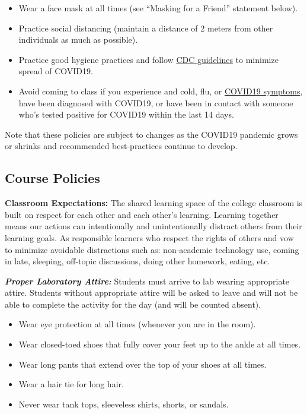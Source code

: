 \documentclass[]{tufte-book}
\providecommand{\tightlist}{%
  \setlength{\itemsep}{0pt}\setlength{\parskip}{0pt}}
\begin{document}
\begin{itemize}
\tightlist
\item
  Wear a face mask at all times (see ``Masking for a Friend'' statement below).
\item
  Practice social distancing (maintain a distance of 2 meters from other individuals as much as possible).
\item
  Practice good hygiene practices and follow \href{https://www.cdc.gov/coronavirus/2019-ncov/prevent-getting-sick/prevention.html}{CDC guidelines} to minimize spread of COVID19.
\item
  Avoid coming to class if you experience and cold, flu, or \href{https://www.cdc.gov/coronavirus/2019-ncov/symptoms-testing/symptoms.html}{COVID19 symptoms}, have been diagnosed with COVID19, or have been in contact with someone who's tested positive for COVID19 within the last 14 days.
\end{itemize}

Note that these policies are subject to changes as the COVID19 pandemic grows or shrinks and recommended best-practices continue to develop.

\hypertarget{course-policies}{%
\subsection*{Course Policies}\label{course-policies}}

\textbf{Classroom Expectations:} The shared learning space of the college classroom is built on respect for each other and each other's learning. Learning together means our actions can intentionally and unintentionally distract others from their learning goals. As responsible learners who respect the rights of others and vow to minimize avoidable distractions such as: non-academic technology use, coming in late, sleeping, off-topic discussions, doing other homework, eating, etc.

\textbf{\emph{Proper Laboratory Attire:}} Students must arrive to lab wearing appropriate attire. Students without appropriate attire will be asked to leave and will not be able to complete the activity for the day (and will be counted absent).

\begin{itemize}
\tightlist
\item
  Wear eye protection at all times (whenever you are in the room).\\
\item
  Wear closed-toed shoes that fully cover your feet up to the ankle at all times.\\
\item
  Wear long pants that extend over the top of your shoes at all times.\\
\item
  Wear a hair tie for long hair.\\
\item
  Never wear tank tops, sleeveless shirts, shorts, or sandals.
\end{itemize}
\end{document}
